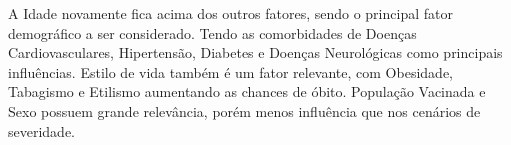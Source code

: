 A Idade novamente fica acima dos outros fatores, sendo o principal fator demográfico a ser considerado. Tendo as comorbidades de Doenças Cardiovasculares, Hipertensão, Diabetes e Doenças Neurológicas como principais influências. Estilo de vida também é um fator relevante, com Obesidade, Tabagismo e Etilismo aumentando as chances de óbito. População Vacinada e Sexo possuem grande relevância, porém menos influência que nos cenários de severidade.




